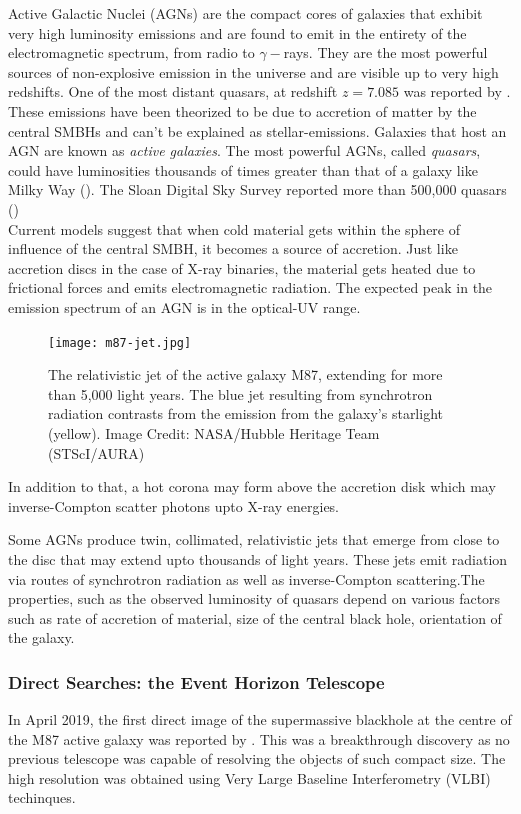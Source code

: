 \documentclass[twocolumn]{aastex63}
\begin{document}
Active Galactic Nuclei (AGNs) are the compact cores of galaxies that exhibit very high luminosity emissions and are found to emit in the entirety of the electromagnetic spectrum, from radio to $\gamma-$rays. They are the most powerful sources of non-explosive emission in the universe and are visible up to very high redshifts. One of the most distant quasars, at redshift $z = 7.085$ was reported by \cite{2011Natur.474..616M}. These emissions have been theorized to be due to accretion of matter by the central SMBHs and can't be explained as stellar-emissions. Galaxies that host an AGN are known as \textit{active galaxies}. The most powerful AGNs, called \textit{quasars}, could have luminosities thousands of times greater than that of a galaxy like Milky Way (\cite{2015Natur.518..512W}). The Sloan Digital Sky Survey reported more than 500,000 quasars (\cite{P_ris_2018})\\

Current models suggest that when cold material gets within the sphere of influence of the central SMBH, it becomes a source of accretion. Just like accretion discs in the case of X-ray binaries,  the material gets heated due to frictional forces and emits electromagnetic radiation. The expected peak in the emission spectrum of an AGN is in the optical-UV range.

\begin{figure}[H]
    \centering
    \texttt{[image: m87-jet.jpg]}
    \caption{The relativistic jet of the active galaxy M87, extending for more than 5,000 light years. The blue jet resulting from synchrotron radiation contrasts from the emission from the galaxy's starlight (yellow). Image Credit: NASA/Hubble Heritage Team (STScI/AURA)}
    \label{fig:m87_jet}
\end{figure}

In addition to that, a hot corona may form above the accretion disk which may inverse-Compton scatter photons upto X-ray energies.

Some AGNs produce twin, collimated, relativistic jets that emerge from close to the disc that may extend upto thousands of light years. These jets emit radiation via routes of synchrotron radiation as well as inverse-Compton scattering.The properties, such as the observed luminosity of quasars depend on various factors such as rate of accretion of material, size of the central black hole, orientation of the galaxy.

\subsubsection{Direct Searches: the Event Horizon Telescope} \label{EHTsection}
In April 2019, the first direct image of the supermassive blackhole at the centre of the M87 active galaxy was reported by \cite{2019ApJ...875L...1E}. This was a breakthrough discovery as no previous telescope was capable of resolving the objects of such compact size. The high resolution was obtained using Very Large Baseline Interferometry (VLBI) techinques. 
\end{document}
